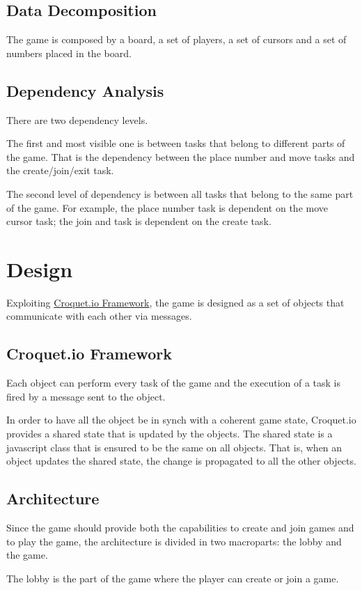 \documentclass[12pt, a4paper]{report}
\begin{document}
\section{Data Decomposition}
The game is composed by a board, a set of players, a set of cursors and a set of numbers placed in the board.

\section{Dependency Analysis}
There are two dependency levels.

The first and most visible one is between tasks 
 that belong to different parts of the game. That is the dependency between the place 
 number and move tasks and the create/join/exit task.
 
The second level of dependency is between all tasks that belong to the same part of the game. For example, the place 
 number task is dependent on the move cursor task; the join and task is dependent on the create task.

\chapter{Design}
Exploiting \href{https://croquet.io/}{Croquet.io Framework}, the game is designed as a set of objects that communicate with each other via messages.

\section{Croquet.io Framework}
Each object can perform every task of the game and the execution of a task is fired by a message sent to the object.

In order to have all the object be in synch with a coherent game state, Croquet.io provides a shared state that is updated by the objects.
 The shared state is a javascript class that is ensured to be the same on all objects. That is, when an object updates the shared state,
 the change is propagated to all the other objects.

\section{Architecture}
Since the game should provide both the capabilities to create and join games and to play the game,
 the architecture is divided in two macroparts: the lobby and the game. 
 
The lobby is the part of the game where the player can create or join a game.
\end{document}
